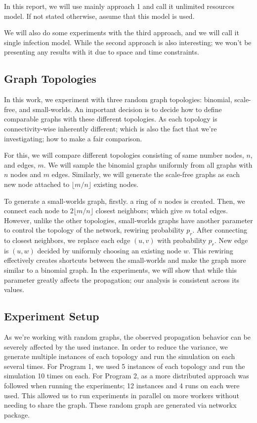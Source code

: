 \documentclass[conference]{IEEEtran}
\begin{document}
In this report, we will use mainly approach 1 and call it unlimited resources model. If not stated otherwise, assume that this model is used.

We will also do some experiments with the third approach, and we will call it single infection model. While the second approach is also interesting; we won't be presenting any results with it due to space and time constraints.

\subsection{Graph Topologies}

In this work, we experiment with three random graph topologies: binomial, scale-free, and small-worlds. An important decision is
to decide how to define comparable graphs with these different topologies. As each topology is connectivity-wise inherently different; which is also the fact that we're investigating; how to make a fair comparison.

For this, we will compare different topologies consisting of same number nodes, $n$, and edges, $m$. We will sample the binomial graphs uniformly from all graphs with $n$ nodes and $m$ edges. Similarly, we will generate the scale-free graphs as each new node attached to $\lfloor m/n\rfloor$ existing nodes.

To generate a small-worlds graph, firstly. a ring of $n$ nodes is created. Then, we connect each node to $2\lfloor m/n\rfloor$ closest neighbors; which give $m$ total edges. However, unlike the other topologies, small-worlds graphs have another parameter to control the topology of the network, rewiring probability $p_r$. After connecting to closest neighbors, we replace each edge $(u,v)$ with probability $p_r$. New edge is $(u,w)$ decided by uniformly choosing an existing node $w$. This rewiring effectively creates shortcuts between the small-worlds and make the graph more similar to a binomial graph. In the experiments, we will show that while this parameter greatly affects the propagation; our analysis is consistent across its values.


\subsection{Experiment Setup}

As we're working with random graphs, the observed propagation behavior can be severely affected by the used instance. In order to reduce the variance, we generate multiple instances of each topology and run the simulation on each several times. For Program 1, we used 5 instances of each topology and run the simulation 10 times on each. For Program 2, as a more distributed approach was followed when running the experiments; 12 instances and 4 runs on each were used. This allowed us to run experiments in parallel on more workers without needing to share the graph. These random graph are generated via networkx package.\cite{networkx}
\end{document}
